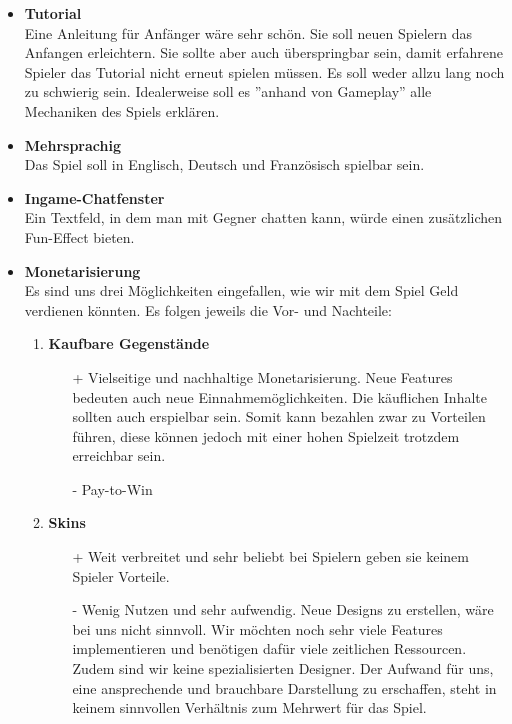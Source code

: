 \begin{itemize}
    \item \textbf{Tutorial} \\
        Eine Anleitung für Anfänger wäre sehr schön. Sie soll neuen Spielern das Anfangen erleichtern. Sie sollte aber auch überspringbar sein,
        damit erfahrene Spieler das Tutorial nicht erneut spielen müssen. Es soll weder allzu lang noch zu schwierig sein. Idealerweise soll es ''anhand von Gameplay'' alle Mechaniken des Spiels
        erklären.
    \item \textbf{Mehrsprachig} \\
        Das Spiel soll in Englisch, Deutsch und Französisch spielbar sein.
    \item \textbf{Ingame-Chatfenster}\\
        Ein Textfeld, in dem man mit Gegner chatten kann, würde einen zusätzlichen Fun-Effect bieten.
    \item \textbf{Monetarisierung} \\
    Es sind uns drei Möglichkeiten eingefallen, wie wir mit dem Spiel Geld verdienen könnten. Es folgen jeweils die Vor- und Nachteile:
    \begin{enumerate}
        \item \textbf{Kaufbare Gegenstände}
        \begin{itemize}
            \item[+] Vielseitige und nachhaltige Monetarisierung. Neue Features bedeuten auch neue Einnahmemöglichkeiten. Die käuflichen Inhalte sollten
                        auch erspielbar sein. Somit kann bezahlen zwar zu Vorteilen führen, diese können jedoch mit einer hohen Spielzeit trotzdem erreichbar sein.
            \item[-] Pay-to-Win
        \end{itemize}
        \item \textbf{Skins}
        \begin{itemize}
            \item[+] Weit verbreitet und sehr beliebt bei Spielern geben sie keinem Spieler Vorteile.
            \item[-] Wenig Nutzen und sehr aufwendig. Neue Designs zu erstellen, wäre bei uns nicht sinnvoll.
                        Wir möchten noch sehr viele Features implementieren und benötigen dafür viele zeitlichen Ressourcen. Zudem sind wir keine spezialisierten Designer. Der Aufwand für uns, eine ansprechende und brauchbare Darstellung zu erschaffen, steht in keinem sinnvollen Verhältnis zum Mehrwert für das Spiel.
        \end{itemize}

\end{enumerate}
\end{itemize}
